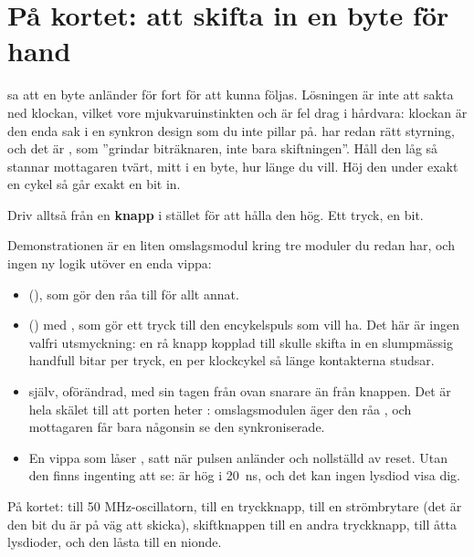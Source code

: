 \section{På kortet: att skifta in en byte för hand}
\label{c6:sec:shiftdemo}

 sa att en byte anländer för fort för att kunna följas. Lösningen är inte att
sakta ned klockan, vilket vore mjukvaruinstinkten och är fel drag i hårdvara: klockan är den enda
sak i en synkron design som du inte pillar på.  har redan rätt styrning, och det är
, som ”grindar biträknaren, inte bara skiftningen”. Håll den låg så stannar
mottagaren tvärt, mitt i en byte, hur länge du vill. Höj den under exakt en cykel så går exakt en
bit in.

Driv alltså  från en \textbf{knapp} i stället för att hålla den hög. Ett tryck,
en bit.

Demonstrationen är en liten omslagsmodul kring tre moduler du redan har, och ingen ny logik utöver
en enda vippa:
\begin{itemize}
  \item {} (), som gör den råa  till
     för allt annat.
  \item {} () med , som gör ett tryck
    till den encykelspuls som  vill ha. Det här är ingen valfri utsmyckning: en
    rå knapp kopplad till  skulle skifta in en slumpmässig handfull bitar per
    tryck, en per klockcykel så länge kontakterna studsar.
  \item {} själv, oförändrad, med sin  tagen från
     ovan snarare än från knappen. Det är hela skälet till att porten heter
    : omslagsmodulen äger den råa , och mottagaren får bara någonsin
    se den synkroniserade.
  \item En vippa som låser , satt när pulsen anländer och nollställd av reset.
    Utan den finns ingenting att se:  är hög i 20~ns, och det kan ingen lysdiod
    visa dig.
\end{itemize}

På kortet:  till 50 MHz-oscillatorn,  till en tryckknapp,
 till en strömbrytare (det är den bit du är på väg att skicka), skiftknappen till
en andra tryckknapp,  till åtta lysdioder, och den låsta
 till en nionde.

